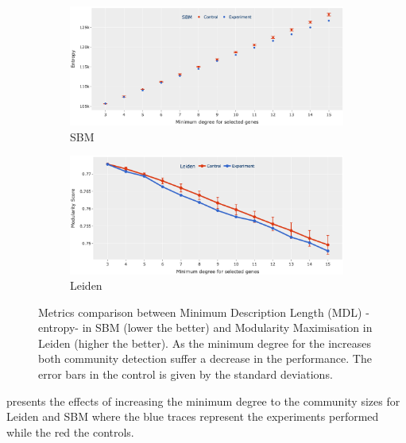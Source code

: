 \begin{figure}[!h]
    \centering
    \begin{subfigure}[!t]{1.0\textwidth}
        \includegraphics[width=\textwidth]{Sections/Network_I/Resources/selective_pruning/com_comp/sbm_ent_sel_prun.png}
        \caption{SBM}
        \label{fig:N_I:sbm_com_det_met}
    \end{subfigure}\hspace{\fill} 
    \begin{subfigure}[!t]{1.0\textwidth}
        \includegraphics[width=\linewidth]{Sections/Network_I/Resources/selective_pruning/com_comp/leid_mod_sel_prun.png}
        \caption{Leiden}
        \label{fig:N_I:leid_com_det_met}
    \end{subfigure}
    \caption{Metrics comparison between Minimum Description Length (MDL) - entropy- in SBM (lower the better) and Modularity Maximisation in Leiden (higher the better). As the minimum degree for the increases both community detection suffer a decrease in the performance. The error bars in the control is given by the standard deviations.}
    \label{fig:N_I:com_det_met}
\end{figure}

 presents the effects of increasing the minimum degree to the community sizes for Leiden and SBM where the blue traces represent the experiments performed while the red the controls. 

